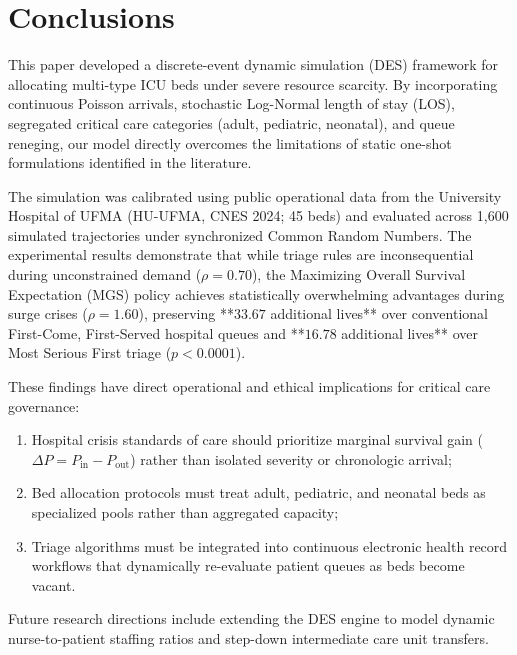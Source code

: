\documentclass{ro}
\begin{document}
\section{Conclusions}
\label{sec:conclusion}

This paper developed a discrete-event dynamic simulation (DES) framework for allocating multi-type ICU beds under severe resource scarcity. By incorporating continuous Poisson arrivals, stochastic Log-Normal length of stay (LOS), segregated critical care categories (adult, pediatric, neonatal), and queue reneging, our model directly overcomes the limitations of static one-shot formulations identified in the literature.

The simulation was calibrated using public operational data from the University Hospital of UFMA (HU-UFMA, CNES 2024; 45 beds) and evaluated across 1,600 simulated trajectories under synchronized Common Random Numbers. The experimental results demonstrate that while triage rules are inconsequential during unconstrained demand ($\rho = 0.70$), the Maximizing Overall Survival Expectation (MGS) policy achieves statistically overwhelming advantages during surge crises ($\rho = 1.60$), preserving **$33.67$ additional lives** over conventional First-Come, First-Served hospital queues and **$16.78$ additional lives** over Most Serious First triage ($p < 0.0001$).

These findings have direct operational and ethical implications for critical care governance:
\begin{enumerate}[(1)]
    \item Hospital crisis standards of care should prioritize marginal survival gain ($\Delta P = P_{\text{in}} - P_{\text{out}}$) rather than isolated severity or chronologic arrival;
    \item Bed allocation protocols must treat adult, pediatric, and neonatal beds as specialized pools rather than aggregated capacity;
    \item Triage algorithms must be integrated into continuous electronic health record workflows that dynamically re-evaluate patient queues as beds become vacant.
\end{enumerate}

Future research directions include extending the DES engine to model dynamic nurse-to-patient staffing ratios and step-down intermediate care unit transfers.



\end{document}
